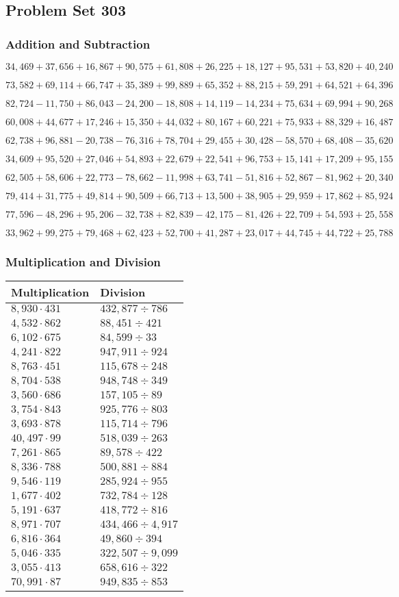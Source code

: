 \hypertarget{problem-set-303}{%
\subsection{Problem Set 303}\label{problem-set-303}}

\hypertarget{addition-and-subtraction}{%
\subsubsection{Addition and
Subtraction}\label{addition-and-subtraction}}

\(34,469+37,656+16,867+90,575+61,808+26,225+18,127+95,531+53,820+40,240\)

\(73,582+69,114+66,747+35,389+99,889+65,352+88,215+59,291+64,521+64,396\)

\(82,724-11,750+86,043-24,200-18,808+14,119-14,234+75,634+69,994+90,268\)

\(60,008+44,677+17,246+15,350+44,032+80,167+60,221+75,933+88,329+16,487\)

\(62,738+96,881-20,738-76,316+78,704+29,455+30,428-58,570+68,408-35,620\)

\(34,609+95,520+27,046+54,893+22,679+22,541+96,753+15,141+17,209+95,155\)

\(62,505+58,606+22,773-78,662-11,998+63,741-51,816+52,867-81,962+20,340\)

\(79,414+31,775+49,814+90,509+66,713+13,500+38,905+29,959+17,862+85,924\)

\(77,596-48,296+95,206-32,738+82,839-42,175-81,426+22,709+54,593+25,558\)

\(33,962+99,275+79,468+62,423+52,700+41,287+23,017+44,745+44,722+25,788\)

\hypertarget{multiplication-and-division}{%
\subsubsection{Multiplication and
Division}\label{multiplication-and-division}}

\begin{longtable}[]{@{}ll@{}}
\toprule
Multiplication & Division\tabularnewline
\midrule
\endhead
\(8,930\cdot431\) & \(432,877÷786\)\tabularnewline
\(4,532\cdot862\) & \(88,451÷421\)\tabularnewline
\(6,102\cdot675\) & \(84,599÷33\)\tabularnewline
\(4,241\cdot822\) & \(947,911÷924\)\tabularnewline
\(8,763\cdot451\) & \(115,678÷248\)\tabularnewline
\(8,704\cdot538\) & \(948,748÷349\)\tabularnewline
\(3,560\cdot686\) & \(157,105÷89\)\tabularnewline
\(3,754\cdot843\) & \(925,776÷803\)\tabularnewline
\(3,693\cdot878\) & \(115,714÷796\)\tabularnewline
\(40,497\cdot99\) & \(518,039÷263\)\tabularnewline
\(7,261\cdot865\) & \(89,578÷422\)\tabularnewline
\(8,336\cdot788\) & \(500,881÷884\)\tabularnewline
\(9,546\cdot119\) & \(285,924÷955\)\tabularnewline
\(1,677\cdot402\) & \(732,784÷128\)\tabularnewline
\(5,191\cdot637\) & \(418,772÷816\)\tabularnewline
\(8,971\cdot707\) & \(434,466÷4,917\)\tabularnewline
\(6,816\cdot364\) & \(49,860÷394\)\tabularnewline
\(5,046\cdot335\) & \(322,507÷9,099\)\tabularnewline
\(3,055\cdot413\) & \(658,616÷322\)\tabularnewline
\(70,991\cdot87\) & \(949,835÷853\)\tabularnewline
\bottomrule
\end{longtable}
